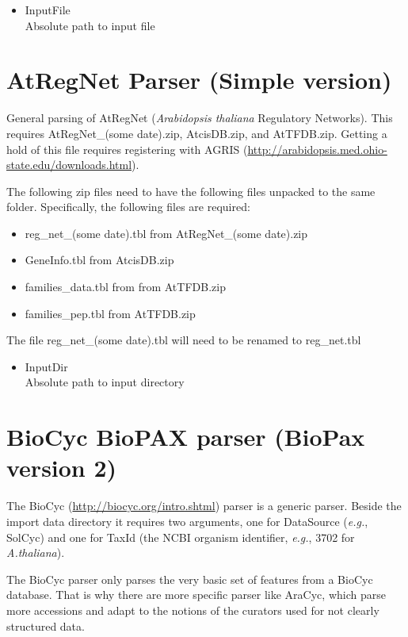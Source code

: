 \begin{itemize}
  \item{InputFile}\\
  Absolute path to input file
\end{itemize}
    
\section{AtRegNet Parser (Simple version)}
General parsing of AtRegNet ({\it{Arabidopsis thaliana}} Regulatory Networks).
This requires AtRegNet\_(some date).zip, AtcisDB.zip, and AtTFDB.zip.
Getting a hold of this file requires registering with AGRIS (\url{http://arabidopsis.med.ohio-state.edu/downloads.html}).

The following zip files need to have the following files unpacked to the same folder. Specifically, the following files are required:
\begin{itemize}
  \item reg\_net\_(some date).tbl from AtRegNet\_(some date).zip
  \item GeneInfo.tbl from AtcisDB.zip
  \item families\_data.tbl from from AtTFDB.zip
  \item families\_pep.tbl from AtTFDB.zip
\end{itemize}

The file reg\_net\_(some date).tbl will need to be renamed to reg\_net.tbl
\begin{itemize}
  \item{InputDir}\\
  Absolute path to input directory
\end{itemize}
   
\section{BioCyc BioPAX parser (BioPax version 2)}   
The BioCyc (\url{http://biocyc.org/intro.shtml}) parser is a generic parser. 
Beside the import data directory it requires two arguments, one for DataSource ({\it{e.g.}}, SolCyc) 
and one for TaxId (the NCBI organism identifier, {\it{e.g.}}, 3702 for {\it{A.thaliana}}).

The BioCyc parser only parses the very basic set of features from a BioCyc database. 
That is why there are more specific parser like AraCyc, 
which parse more accessions and adapt to the notions of the curators used for not clearly structured data.

